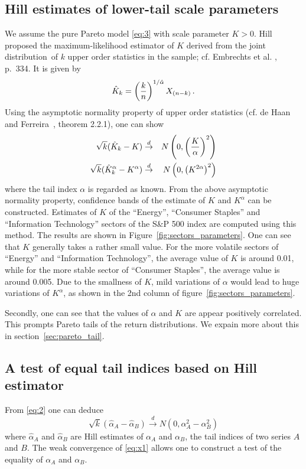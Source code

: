 \documentclass[11pt,a4]{amsart}
\newcommand{\beao}{\begin{eqnarray*}}
\newcommand{\eeao}{\end{eqnarray*}\noindent}
\newcommand{\ds}{distribution}
\newcommand{\1}{{\mathbf 1}}
\begin{document}
\subsection{Hill estimates of lower-tail scale parameters}\label{sec:HillScaleEstimates}
We assume the pure Pareto model \eqref{eq:3} with scale parameter $K>0$.
Hill \cite{hill1975simple} proposed  the maximum-likelihood estimator of $K$
derived from the joint \ds\ of $k$ upper order statistics in the sample; cf.
Embrechts et al. \cite{embrechts:klueppelberg:mikosch:1997}, p.~334.
It is given by
\beao
\hat K_k = \left({k \over n}\right)^{1/\hat\alpha} X_{(n-k)}\,.
\eeao
Using the asymptotic normality property of upper order statistics
(cf. de Haan and Ferreira~\cite{haan:ferreira:2006}, theorem 2.2.1), one can show
\begin{eqnarray*}
  \sqrt k (\hat K_k - K) &\overset{d}{\to}& N\left(
    0, \left( {K \over \alpha}  \right)^2
  \right) \\
  \sqrt k (\hat K_k^\alpha - K^\alpha) &\overset{d}{\to}& N\left(
    0, \left( {K^{2\alpha}}  \right)^2
  \right)
\end{eqnarray*}
where the tail index $\alpha$ is regarded as known. From the above
asymptotic normality property, confidence bands of the estimate of $K$
and $K^\alpha$ can be constructed. 
Estimates of $K$ of the ``Energy'', ``Consumer Staples'' and
``Information Technology'' sectors of the S\&P 500 index are computed
using this method. The results are shown in
Figure~\ref{fig:sectors_parameters}.
One can see that $K$ generally takes a rather small value. For the
more volatile sectors of ``Energy'' and ``Information Technology'',
the average value of $K$ is around 0.01, while for the more stable
sector of ``Consumer Staples'', the average value is around 0.005. Due
to the smallness of $K$, mild variations of $\alpha$ would lead to
huge variations of $K^\alpha$, as shown in the 2nd column of
figure~\ref{fig:sectors_parameters}.

Secondly, one can see that the values of $\alpha$ and $K$ are appear
positively correlated. This prompts Pareto tails of the return
distributions. We expain more about this in
section~\ref{sec:pareto_tail}.

\subsection{A test of equal tail indices based on Hill estimator}
From \eqref{eq:2} one can deduce
\begin{equation}
  \label{eq:x1}
  \sqrt k (\hat \alpha_A - \hat \alpha_B) \overset{d}{\to} N(0, \alpha_A^2 - \alpha_B^2)  
\end{equation}
where $\hat \alpha_A$ and $\hat \alpha_B$ are Hill estimates of
$\alpha_A$ and $\alpha_B$, the tail indices of two series $A$ and
$B$. The weak convergence of \eqref{eq:x1} allows one to construct a
test of the equality of $\alpha_A$ and $\alpha_B$.
\end{document}
